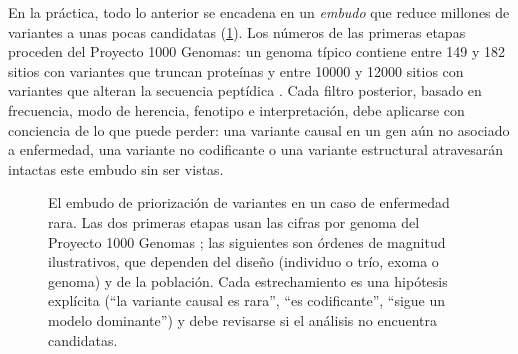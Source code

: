 En la práctica, todo lo anterior se encadena en un \emph{embudo} que reduce millones de variantes a unas pocas candidatas (\cref{fig:09-embudo}). Los números de las primeras etapas proceden del Proyecto 1000 Genomas: un genoma típico contiene entre 149 y 182 sitios con variantes que truncan proteínas y entre \num{10000} y \num{12000} sitios con variantes que alteran la secuencia peptídica \parencite{c09-auton2015}. Cada filtro posterior, basado en frecuencia, modo de herencia, fenotipo e interpretación, debe aplicarse con conciencia de lo que puede perder: una variante causal en un gen aún no asociado a enfermedad, una variante no codificante o una variante estructural atravesarán intactas este embudo sin ser vistas.

\begin{figure}[t]
\centering
{}
\caption[El embudo de priorización]{El embudo de priorización de variantes en un caso de enfermedad rara. Las dos primeras etapas usan las cifras por genoma del Proyecto 1000 Genomas \parencite{c09-auton2015}; las siguientes son órdenes de magnitud ilustrativos, que dependen del diseño (individuo o trío, exoma o genoma) y de la población. Cada estrechamiento es una hipótesis explícita (``la variante causal es rara'', ``es codificante'', ``sigue un modelo dominante'') y debe revisarse si el análisis no encuentra candidatas.}
\label{fig:09-embudo}
\end{figure}

